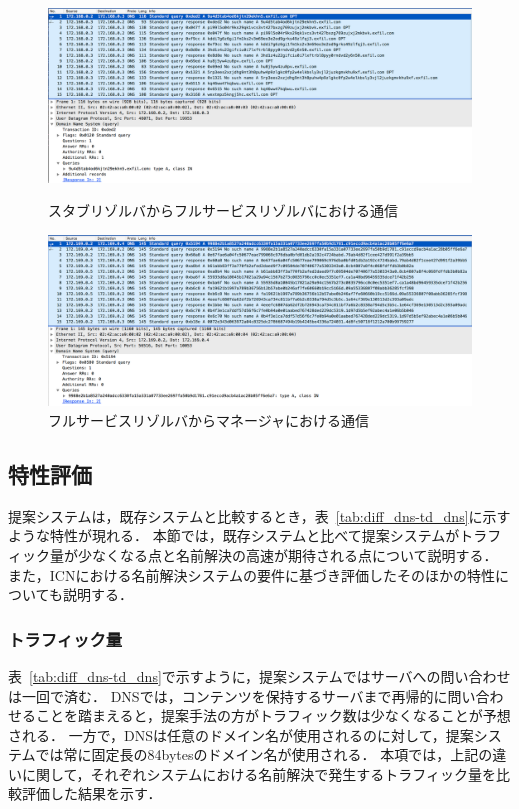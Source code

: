 \begin{figure}[p]
 \centering
 \includegraphics[width=14.5cm]{figure/stab-fullservice.png}
 \vspace{-1cm}
 \caption{スタブリゾルバからフルサービスリゾルバにおける通信}
 \label{fig:stab-fullservice}
 \vspace{1cm}
 \includegraphics[width=14.5cm]{figure/fullresolver-manager.png}
 \vspace{-1cm}
 \caption{フルサービスリゾルバからマネージャにおける通信}
 \label{fig:fullservice-manager}
\end{figure}

\newpage
\subsection{特性評価}
提案システムは，既存システムと比較するとき，表~\ref{tab:diff_dns-td_dns}に示すような特性が現れる．
本節では，既存システムと比べて提案システムがトラフィック量が少なくなる点と名前解決の高速が期待される点について説明する．
また，ICNにおける名前解決システムの要件に基づき評価したそのほかの特性についても説明する．


\subsubsection{トラフィック量}
表~\ref{tab:diff_dns-td_dns}で示すように，提案システムではサーバへの問い合わせは一回で済む．
DNSでは，コンテンツを保持するサーバまで再帰的に問い合わせることを踏まえると，提案手法の方がトラフィック数は少なくなることが予想される．
一方で，DNSは任意のドメイン名が使用されるのに対して，提案システムでは常に固定長の84bytesのドメイン名が使用される．
本項では，上記の違いに関して，それぞれシステムにおける名前解決で発生するトラフィック量を比較評価した結果を示す．

